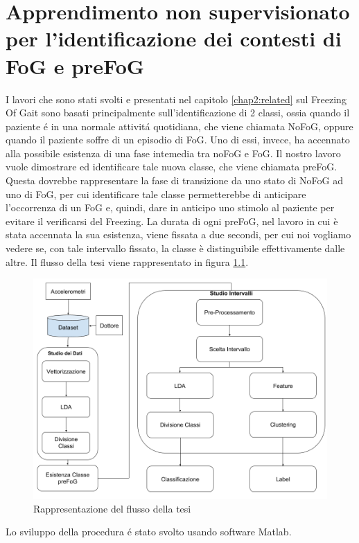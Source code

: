 

\chapter[Apprendimento non supervisionato]{Apprendimento non supervisionato per l'identificazione dei contesti di FoG e preFoG}\label{chap5:Automatic}
I lavori che sono stati svolti e presentati nel capitolo \ref{chap2:related} sul Freezing Of Gait sono basati principalmente sull'identificazione di 2 classi, ossia quando il paziente é in una normale attivitá quotidiana, che viene chiamata NoFoG, oppure quando il paziente soffre di un episodio di FoG. Uno di essi, invece, ha accennato alla possibile esistenza di una fase intemedia tra noFoG e FoG. Il nostro lavoro vuole dimostrare ed identificare tale nuova classe, che viene chiamata preFoG. Questa dovrebbe rappresentare la fase di transizione da uno stato di NoFoG ad uno di FoG, per cui identificare tale classe permetterebbe di anticipare l'occorrenza di un FoG e, quindi, dare in anticipo uno stimolo al paziente per evitare il verificarsi del Freezing. La durata di ogni preFoG, nel lavoro in cui è stata accennata la sua esistenza, viene fissata a due secondi, per cui noi vogliamo vedere se, con tale intervallo fissato, la classe è distinguibile effettivamente dalle altre. Il flusso della tesi viene rappresentato in figura \ref{FlussoTesi}.\\
\begin{figure}[]
	\centering
	\includegraphics[scale=0.35]{images/FlussoTesi.png}
	\caption{Rappresentazione del flusso della tesi}
	\label{FlussoTesi}
\end{figure}
Lo sviluppo della procedura é stato svolto usando software Matlab.
